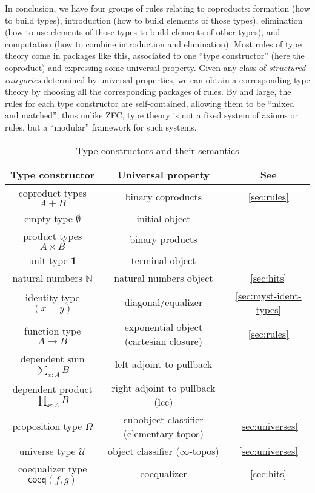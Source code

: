 \documentclass[12pt]{article}
\def\N{\mathbb{N}}
\def\U{\mathscr{U}}
\def\coeq{\mathsf{coeq}}
\def\unit{\mathbf{1}}
\numberwithin{equation}{section}
\begin{document}
In conclusion, we have four groups of rules relating to coproducts: formation (how to build types), introduction (how to build elements of those types), elimination (how to use elements of those types to build elements of other types), and computation (how to combine introduction and elimination).
Most rules of type theory come in packages like this, associated to one ``type constructor'' (here the coproduct) and expressing some universal property.
Given any class of \emph{structured categories} determined by universal properties, we can obtain a corresponding type theory by choosing all the corresponding packages of rules.
By and large, the rules for each type constructor are self-contained, allowing them to be ``mixed and matched''; thus
unlike ZFC, type theory is not a fixed system of axioms or rules, but a ``modular'' framework for such systems.

\begin{table}
  \centering
  \begin{tabular}{c|c|c}
    \textbf{Type constructor} & \textbf{Universal property} & \textbf{See}\\\hline
    coproduct types $A+B$ & binary coproducts & \cref{sec:rules}\\
    empty type $\emptyset$ & initial object\\
    product types $A\times B$ & binary products\\
    unit type $\unit$ & terminal object\\
    natural numbers $\N$ & natural numbers object & \cref{sec:hits} \\
    identity type $(x=y)$ & diagonal/equalizer & \cref{sec:myst-ident-types}\\
    function type $A\to B$ & exponential object (cartesian closure) & \cref{sec:rules}\\
    dependent sum $\sum_{x:A} B$ & left adjoint to pullback\\
    dependent product $\prod_{x:A} B$ & right adjoint to pullback (lcc)\\
    proposition type $\Omega$ & subobject classifier (elementary topos) & \cref{sec:universes}\\
    universe type $\U$ & object classifier ($\infty$-topos) & \cref{sec:universes}\\
    coequalizer type $\coeq(f,g)$ & coequalizer & \cref{sec:hits}\\
  \end{tabular}
  \caption{Type constructors and their semantics}
  \label{tab:type-constructors}
\end{table}
\end{document}
